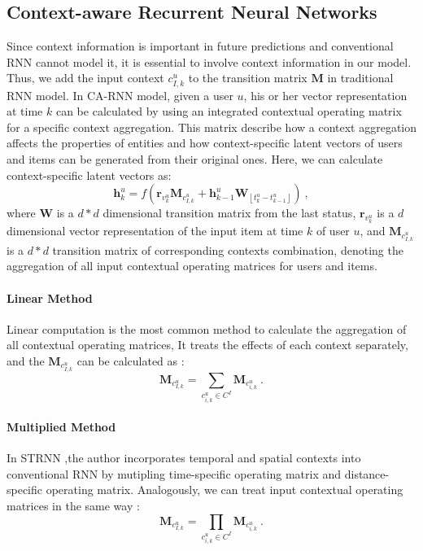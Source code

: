 \documentclass{sig-alternate}
\begin{document}
\subsection{ Context-aware Recurrent Neural Networks}
Since context information is important in future predictions and conventional RNN cannot model it, it is essential to involve context information in our model. Thus, we add the input context $c_{I,k}^{u}$ to the transition matrix $\textbf{M}$ in traditional RNN model. In CA-RNN model, given a user $u$, his or her vector representation at time $k$ can be calculated by using an integrated contextual operating matrix for a specific context aggregation. This matrix describe how a context aggregation affects the properties of entities and how context-specific latent vectors of users and items can be generated from their original ones. Here, we can calculate context-specific latent vectors as: 
\begin{equation}\label{eqHt}
\textbf{h}_{k}^{u}=f\left ( \textbf{r}_{v_{k}^{u}}\textbf{M}_{c_{I,k}^{u}}+\textbf{h}_{k-1}^{u}\textbf{W}_{\left\lfloor t_k^u-t_{k-1}^u \right\rfloor }\right )~,
\end{equation}
where  $\textbf{W}$ is a $d*d$ dimensional transition matrix from the last status, $\textbf{r}_{v_{k}^{u}}$ is a  $d$ dimensional vector representation of the input item at time $k$ of user $u$, and $\textbf{M}_{c_{I,k}^{u}}$ is a  $d*d$ transition matrix of corresponding contexts combination, denoting the aggregation of all input contextual operating matrices for users and items. 

\paragraph{Linear Method}
Linear computation is the most common method to calculate the aggregation of all contextual operating matrices, It treats the effects of each context separately, and the $\textbf{M}_{c_{I,k}^{u}}$ can be calculated as :
\begin{equation} \label{eqMadd}
\textbf{M}_{c_{I,k}^{u}} = \sum_{c_{i,k}^{u}\in C^I} \textbf{M}_{c_{i,k}^{u}} ~.
\end{equation}

\paragraph{Multiplied Method}
In STRNN  \cite{liu2016strnn} ,the author incorporates temporal and spatial contexts into conventional RNN by mutipling time-specific operating matrix and distance-specific operating matrix. Analogously, we can treat input contextual operating matrices in the same way :
\begin{equation}
\textbf{M}_{c_{I,k}^{u}} = \prod_{c_{i,k}^{u}\in C^I} \textbf{M}_{c_{i,k}^{u}} ~.
\end{equation}
\end{document}
